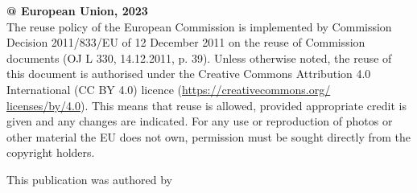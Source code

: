{\begin{titlepage}
        \textbf{@ European Union, 2023}\\ 
        
        The reuse policy of the European Commission is implemented by Commission Decision 2011/833/EU of 12 December 2011 on the reuse of Commission documents (OJ L 330, 14.12.2011, p. 39). Unless otherwise noted, the reuse of this document is authorised under the Creative Commons Attribution 4.0 International (CC BY 4.0) licence (\url{https://creativecommons.org/ licenses/by/4.0}). This means that reuse is allowed, provided appropriate credit is given and any changes are indicated. For any use or reproduction of photos or other material the EU does not own, permission must be sought directly from the copyright holders.

        \clearpage 
        \topskip=120pt
        \begin{center}
            \textbf{\color{blueEC}\Huge\@title}
            \vspace{60pt}
            {\Large\@date}
        \end{center}
    
        \vfill
        This publication was authored by \@author

    \end{titlepage}
}
\makeatother